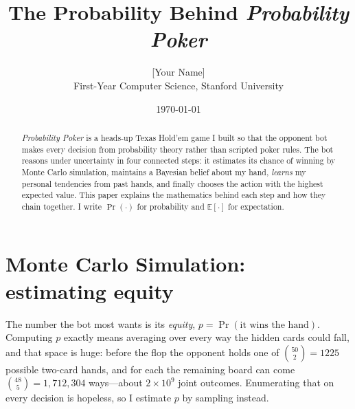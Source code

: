 \documentclass[11pt]{article}
\title{\textbf{The Probability Behind \emph{Probability Poker}}}
\author{[Your Name] \\ \small First-Year Computer Science, Stanford University}
\date{\today}
\begin{document}
\maketitle

\begin{abstract}
\noindent
\emph{Probability Poker} is a heads-up Texas Hold'em game I built so that the
opponent bot makes every decision from probability theory rather than scripted
poker rules. The bot reasons under uncertainty in four connected steps: it
estimates its chance of winning by Monte Carlo simulation, maintains a Bayesian
belief about my hand, \emph{learns} my personal tendencies from past hands, and
finally chooses the action with the highest expected value. This paper explains
the mathematics behind each step and how they chain together. I write
$\Pr(\cdot)$ for probability and $\mathbb{E}[\cdot]$ for expectation.
\end{abstract}

\section{Monte Carlo Simulation: estimating equity}

The number the bot most wants is its \emph{equity}, $p=\Pr(\text{it wins the
hand})$. Computing $p$ exactly means averaging over every way the hidden cards
could fall, and that space is huge: before the flop the opponent holds one of
$\binom{50}{2}=1225$ possible two-card hands, and for each the remaining board
can come $\binom{48}{5}=1{,}712{,}304$ ways---about $2\times10^{9}$ joint
outcomes. Enumerating that on every decision is hopeless, so I estimate $p$ by
sampling instead.
\end{document}

